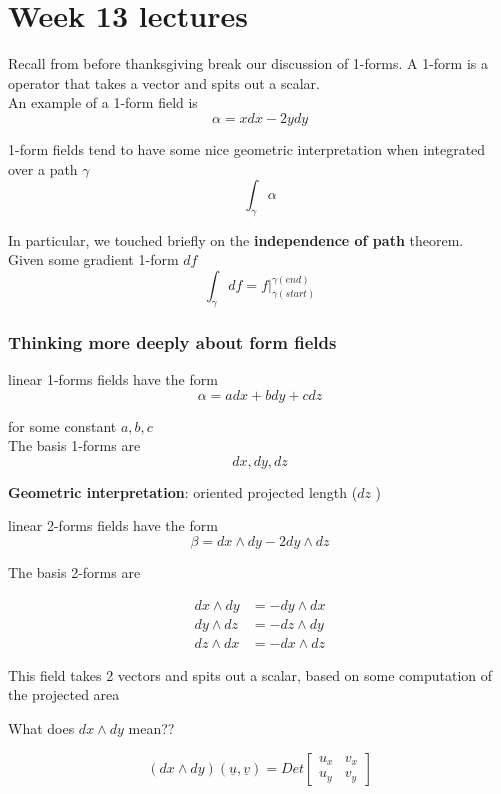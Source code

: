 \chapter{Week 13 lectures}

Recall from before thanksgiving break our discussion of 1-forms. A 1-form is a operator that takes a vector and spits out a scalar. \\

An example of a 1-form field is
\[
  \alpha = xdx - 2ydy
\] 

1-form fields tend to have some nice geometric interpretation when integrated over a path $\gamma$
 \[
    \int_{\gamma} \alpha
\] 

In particular, we touched briefly on the \textbf{independence of path} theorem. \\

Given some gradient 1-form $df$
\[
  \int_{\gamma}^{}   df = \left. f \right|_{\gamma(start)}^{\gamma(end)} 
\] 

\subsection{Thinking more deeply about form fields}

linear 1-forms fields have the form
\[
  \alpha = adx + bdy + cdz
\] 

for some constant $a, b, c$ \\

The basis 1-forms are \[
  dx, dy , dz
\] 

\textbf{Geometric interpretation}: oriented projected length ($dz$ )

linear 2-forms fields have the form
\[
  \beta = dx \wedge dy - 2 dy \wedge dz
\] 

The basis 2-forms are 

\begin{align*}
   dx \wedge dy &= -dy \wedge dx \\
   dy \wedge dz &= -dz \wedge dy \\
   dz \wedge dx &= -dx \wedge dz
\end{align*}

This field takes 2 vectors and spits out a scalar, based on some computation of the projected area

What does $dx \wedge dy$ mean??

\[
   (dx \wedge dy) ( \underline{u}, \underline{v}) = Det \begin{bmatrix} u_x & v_x \\ u_y & v_y
   \end{bmatrix}
\] 

